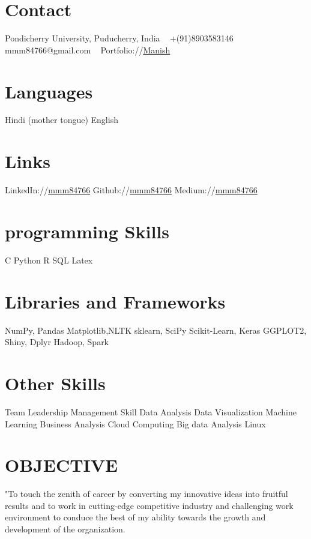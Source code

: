 \documentclass[]{cv-style}          %
\begin{document}



\begin{aside}
%
\section{Contact}
Pondicherry University,
Puducherry, India
~
+(91)8903583146
~
mmm84766@gmail.com
~
Portfolio://\href{http://jupyter.me/}{Manish}
~
%
\section{Languages}
Hindi (mother tongue)
English 
\section{Links} 
LinkedIn://\href{https://www.linkedin.com/in/mmm84766}{mmm84766}
Github://\href{https://github.com/mmm84766}{mmm84766} 
Medium://\href{https://medium.com/@manishkumar_72360}{mmm84766} 
\section{programming Skills}
C
Python
R
SQL
Latex
%
\section{Libraries and Frameworks}
NumPy, Pandas
Matplotlib,NLTK
sklearn, SciPy
Scikit-Learn, Keras
GGPLOT2, Shiny, Dplyr
Hadoop, Spark
\section{Other Skills}
Team Leadership
Management Skill
Data Analysis
Data Visualization
Machine Learning 
Business Analysis
Cloud Computing
Big data Analysis
Linux{}
%
\end{aside}
\section{OBJECTIVE}
  \vspace{-0.2cm}
"To touch the zenith of career by converting my innovative ideas into fruitful results and to work in cutting-edge competitive industry and challenging work  environment to conduce the best of my ability towards the growth and development of the organization.
%
\end{document}
